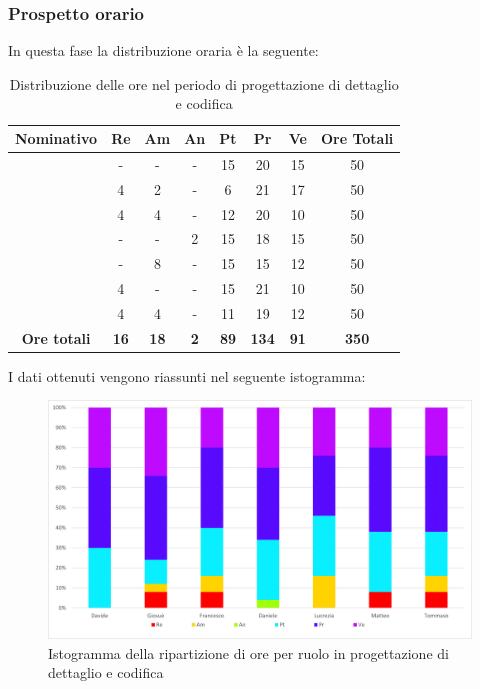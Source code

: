 \subsubsection{Prospetto orario}
In questa fase la distribuzione oraria è la seguente:
\begin{table}[H]
		\begin{center}
			\setlength{\aboverulesep}{0pt}
			\setlength{\belowrulesep}{0pt}
			\setlength{\extrarowheight}{.75ex}
			\begin{tabular}{ c c c c c c c c }
				\rowcolor{AzzurroGruppo!30} 
				\textbf{Nominativo} & \textbf{Re} & \textbf{Am} & \textbf{An} & \textbf{Pt} & \textbf{Pr} & \textbf{Ve} & \textbf{Ore Totali}  \\
				\toprule
				\Davide    & - & - & - & 15 & 20 & 15 & 50 \\
				\Giosue    & 4 & 2 & - & 6 & 21 & 17 & 50 \\
				\Francesco & 4 & 4 & - & 12 & 20 & 10 & 50 \\
				\Daniele   & - & - & 2 & 15 & 18 & 15 & 50 \\
				\Lucrezia  & - & 8 & - & 15 & 15 & 12 & 50 \\
				\Matteo    & 4 & - & - & 15 & 21 & 10 & 50 \\
				\Tommaso   & 4 & 4 & - & 11 & 19 & 12 & 50 \\
				 \textbf{Ore totali} & \textbf{16} & \textbf{18} & \textbf{2} & \textbf{89} & \textbf{134} & \textbf{91} & \textbf{350} \\
				\bottomrule
			\end{tabular}
			\caption{Distribuzione delle ore nel periodo di progettazione di dettaglio e codifica}
		\end{center}
	\end{table}
	I dati ottenuti vengono riassunti nel seguente istogramma:
\begin{figure}[H]
    \centering
    \includegraphics[scale = 0.5]{components/img/Sprint-8-9-isto.png}
    \caption{Istogramma della ripartizione di ore per ruolo in progettazione di dettaglio e codifica}
    \label{fig:Istogramma ripartizione ore , fase di progettazione di dettaglio e codifica}
\end{figure}
